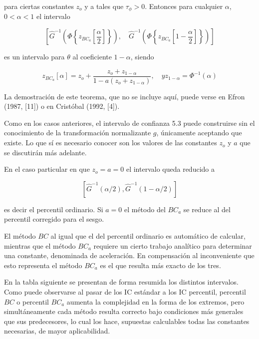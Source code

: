 \documentclass[
]{article}
\begin{document}
para ciertas constantes \(z_{o}\) y a tales que \(\tau_{\phi}>0\). Entonces para cualquier \(\alpha\), \(0<\alpha<1\) el intervalo

\[
\left[\hat{G}^{-1}\left(\Phi\left\{z_{B C_{a}}\left[\frac{\alpha}{2}\right]\right\}\right), \quad \hat{G}^{-1}\left(\Phi\left\{z_{B C_{a}}\left[1-\frac{\alpha}{2}\right]\right\}\right)\right]
\]

es un intervalo para \(\theta\) al coeficiente \(1-\alpha\), siendo

\[
z_{B C_{a}}[\alpha]=z_{o}+\frac{z_{o}+z_{1-\alpha}}{1-a\left(z_{o}+z_{1-\alpha}\right)}, \quad y z_{1-\alpha}=\Phi^{-1}(\alpha)
\]

La demostración de este teorema, que no se incluye aquí, puede verse en Efron (1987, {[}11{]}) o en Cristóbal (1992, {[}4{]}).

Como en los casos anteriores, el intervalo de confianza 5.3 puede construirse sin el conocimiento de la transformación normalizante \(g\), únicamente aceptando que existe. Lo que sí es necesario conocer son los valores de las constantes \(z_{o}\) y \(a\) que se discutirán más adelante.

En el caso particular en que \(z_{o}=a=0\) el intervalo queda reducido a

\[
\left[\hat{G}^{-1}(\alpha / 2), \hat{G}^{-1}(1-\alpha / 2)\right]
\]

es decir el percentil ordinario.
Si \(a=0\) el método del \(B C_{a}\) se reduce al del percentil corregido para el sesgo.

El método \(B C\) al igual que el del percentil ordinario es automático de calcular, mientras que el método \(B C_{a}\) requiere un cierto trabajo analítico para determinar una constante, denominada de aceleración. En compensación al inconveniente que esto representa el método \(B C_{a}\) es el que resulta más exacto de los tres.

En la tabla siguiente se presentan de forma resumida los distintos intervalos. Como puede observarse al pasar de los IC estándar a los IC percentil, percentil \(B C\) o percentil \(B C_{a}\) aumenta la complejidad en la forma de los extremos, pero simultáneamente cada método resulta correcto bajo condiciones más generales que sus predecesores, lo cual los hace, supuestas calculables todas las constantes necesarias, de mayor aplicabilidad.
\end{document}
